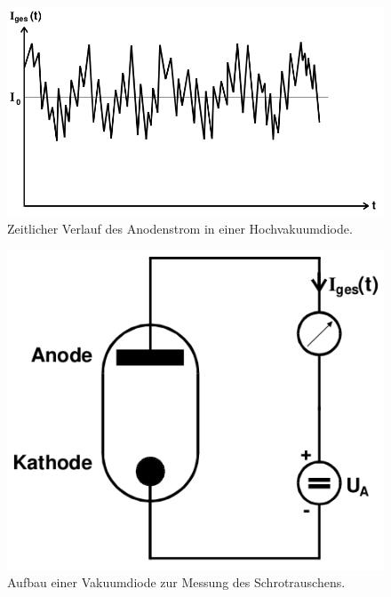 \begin{figure}[!htpb]
  \centering
  \includegraphics[scale=0.3]{bilder/diodenstrom.png}
  \caption{Zeitlicher Verlauf des Anodenstrom in einer
    Hochvakuumdiode.\cite{FP}}
\label{fig:diodenstrom}
\end{figure}

\begin{figure}[!htpb]
  \centering
  \includegraphics[scale=0.3]{bilder/diode.png}
  \caption{Aufbau einer Vakuumdiode zur Messung des Schrotrauschens.\cite{FP}}
\label{fig:diode}
\end{figure}

